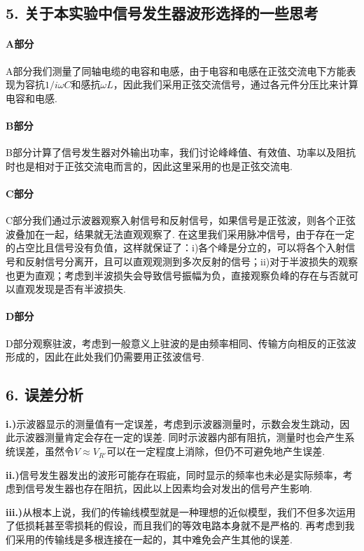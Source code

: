 \documentclass[UTF8]{ctexart}
\begin{document}
\subsection*{5. 关于本实验中信号发生器波形选择的一些思考}
\paragraph{A部分} A部分我们测量了同轴电缆的电容和电感，由于电容和电感在正弦交流电下方能表现为容抗$1/i\omega C$和感抗$\omega L$，因此我们采用正弦交流信号，通过各元件分压比来计算电容和电感.
\paragraph{B部分} B部分计算了信号发生器对外输出功率，我们讨论峰峰值、有效值、功率以及阻抗时也是相对于正弦交流电而言的，因此这里采用的也是正弦交流电.
\paragraph{C部分} C部分我们通过示波器观察入射信号和反射信号，如果信号是正弦波，则各个正弦波叠加在一起，结果就无法直观观察了. 在这里我们采用脉冲信号，由于存在一定的占空比且信号没有负值，这样就保证了：i)各个峰是分立的，可以将各个入射信号和反射信号分离开，且可以直观观测到多次反射的信号；ii)对于半波损失的观察也更为直观；考虑到半波损失会导致信号振幅为负，直接观察负峰的存在与否就可以直观发现是否有半波损失.
\paragraph{D部分}D部分观察驻波，考虑到一般意义上驻波的是由频率相同、传输方向相反的正弦波形成的，因此在此处我们仍需要用正弦波信号.

\subsection*{6. 误差分析}

\textbf{i.)}示波器显示的测量值有一定误差，考虑到示波器测量时，示数会发生跳动，因此示波器测量肯定会存在一定的误差. 同时示波器内部有阻抗，测量时也会产生系统误差，虽然令$V\approx V_{R'}$可以在一定程度上消除，但仍不可避免地产生误差.\par

\textbf{ii.)}信号发生器发出的波形可能存在瑕疵，同时显示的频率也未必是实际频率，考虑到信号发生器也存在阻抗，因此以上因素均会对发出的信号产生影响.

\textbf{iii.)}从根本上说，我们的传输线模型就是一种理想的近似模型，我们不但多次运用了低损耗甚至零损耗的假设，而且我们的等效电路本身就不是严格的. 再考虑到我们采用的传输线是多根连接在一起的，其中难免会产生其他的误差.
\end{document}
